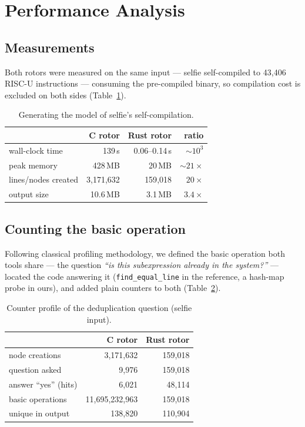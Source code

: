 \documentclass[sigplan,screen,nonacm]{acmart}
\begin{document}
\section{Performance Analysis}
\label{sec:performance}

\subsection{Measurements}

Both rotors were measured on the same input --- selfie self-compiled to
43{,}406 RISC-U instructions --- consuming the pre-compiled binary, so
compilation cost is excluded on both sides (Table~\ref{tab:perf}).

\begin{table}[t]
\caption{Generating the model of selfie's self-compilation.}
\label{tab:perf}
\centering
\footnotesize
\begin{tabular}{lrrr}
\toprule
 & C rotor & Rust rotor & ratio \\
\midrule
wall-clock time & 139\,s & 0.06--0.14\,s & ${\sim}10^3$ \\
peak memory & 428\,MB & 20\,MB & ${\sim}21\times$ \\
lines/nodes created & 3{,}171{,}632 & 159{,}018 & $20\times$ \\
output size & 10.6\,MB & 3.1\,MB & $3.4\times$ \\
\bottomrule
\end{tabular}
\end{table}

\subsection{Counting the basic operation}

Following classical profiling methodology, we defined the basic
operation both tools share --- the question \emph{``is this
subexpression already in the system?''} --- located the code answering
it (\texttt{find\_equal\_line} in the reference, a hash-map probe in
ours), and added plain counters to both (Table~\ref{tab:counters}).

\begin{table}[t]
\caption{Counter profile of the deduplication question (selfie input).}
\label{tab:counters}
\centering
\footnotesize
\begin{tabular}{lrr}
\toprule
 & C rotor & Rust rotor \\
\midrule
node creations & 3{,}171{,}632 & 159{,}018 \\
question asked & 9{,}976 & 159{,}018 \\
answer ``yes'' (hits) & 6{,}021 & 48{,}114 \\
basic operations & 11{,}695{,}232{,}963 & 159{,}018 \\
unique in output & 138{,}820 & 110{,}904 \\
\bottomrule
\end{tabular}
\end{table}
\end{document}
